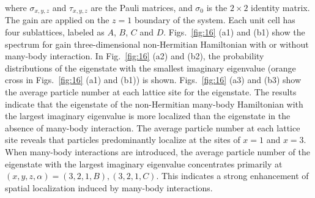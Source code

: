 \documentclass[longbibliography, aps, prx, amsmath, amssymb, amsfonts, twocolumn,superscriptaddress, footinbib]{revtex4-1}
\begin{document}
	where $\sigma_{x,y,z}$ and $\tau_{x,y,z}$ are the Pauli matrices, and $\sigma_0$ is the $2\times 2$ identity matrix. The gain are applied on the $z=1$ boundary of the system. Each unit cell has four sublattices, labeled as $A$, $B$, $C$ and $D$. 
	Figs.~\ref{fig:16} (a1) and (b1) show the spectrum for gain three-dimensional non-Hermitian Hamiltonian with or without many-body interaction. 
	In Fig.~\ref{fig:16} (a2) and (b2), the probability distributions of the eigenstate with the smallest imaginary eigenvalue (orange cross in Figs.~\ref{fig:16} (a1) and (b1)) is shown.
	 Figs.~\ref{fig:16} (a3) and (b3) show the average particle number at each lattice site for the eigenstate.
	The results indicate that the eigenstate of the non-Hermitian many-body Hamiltonian with the largest imaginary eigenvalue is more localized than the eigenstate in the absence of many-body interaction.
	The average particle number at each lattice site reveals that particles predominantly localize at the sites of $x=1$ and $x=3$.
	When many-body interactions are introduced, the average particle number of the eigenstate with the largest imaginary eigenvalue concentrates primarily at $(x,y,z,\alpha)=(3,2,1,B),(3,2,1,C)$. This indicates a strong enhancement of spatial localization induced by many-body interactions. 
\end{document}
